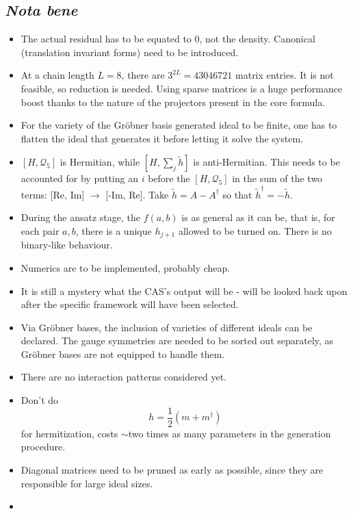 \documentclass[a4paper, 11pt, twoside, onecolumn]{article}
\newcommand{\qot}{\mathcal{Q}_5}
\newcommand{\Q}{\mathcal{Q}}
\newcommand{\htil}{\tilde{h}}
\newcommand{\nyil}{\rightarrow}
\begin{document}
\subsection{\textit{Nota bene}}
\begin{itemize}
    \item The actual residual has to be equated to 0, not the density. Canonical (translation invariant forms) need to be introduced.
    \item At a chain length $L=8$, there are $3^{2L}=43046721$ matrix entries. It is not feasible, so reduction is needed. Using sparse matrices is a huge performance boost thanks to the nature of the projectors present in the core formula.
    \item For the variety of the Gröbner basis generated ideal to be finite, one has to flatten the ideal that generates it before letting it solve the system.
    \item $[H,\Q_5]$ is Hermitian, while $[H,\sum_j \htil]$ is anti-Hermitian. This needs to be accounted for by putting an $i$ before the $[H,\qot]$ in the sum of the two terms: [Re, Im] $\nyil$ [-Im, Re]. Take $\htil=A-A^\dagger$ so that $\htil^\dagger=-\htil$.
    \item During the ansatz stage, the $f(a,b)$ is as general as it can be, that is, for each pair $a,b$, there is a unique $h_{j+1}$ allowed to be turned on. There is no binary-like behaviour.
    \item Numerics are to be implemented, probably cheap.
    \item It is still a mystery what the CAS's output will be - will be looked back upon after the specific framework will have been selected.
    \item Via Gröbner bases, the inclusion of varieties of different ideals can be declared. The gauge symmetries are needed to be sorted out separately, as Gröbner bases are not equipped to handle them.
    \item There are no interaction patterns considered yet.
    \item Don't do 
    \begin{equation}
        h=\frac{1}{2}(m+m^\dagger)
    \end{equation}
    for hermitization, costs $\sim$two times as many parameters in the generation procedure.
    \item Diagonal matrices need to be pruned as early as possible, since they are responsible for large ideal sizes.
    \item 
\end{itemize}
\end{document}
